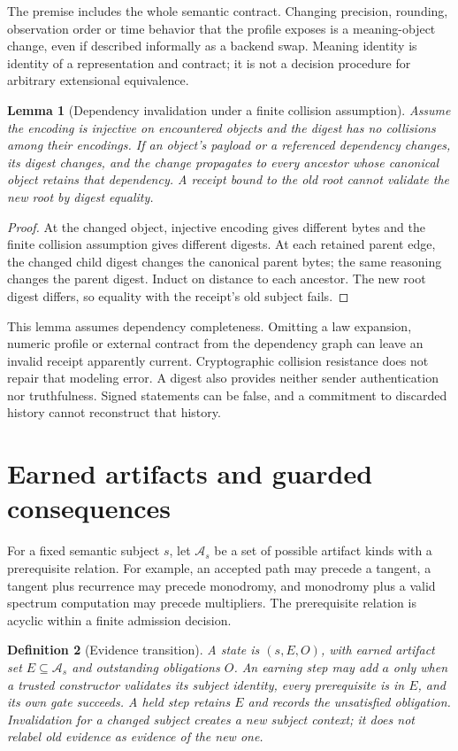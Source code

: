 \documentclass[11pt]{article}
\newtheorem{definition}{Definition}[section]
\newtheorem{lemma}[definition]{Lemma}
\theoremstyle{remark}
\begin{document}
The premise includes the whole semantic contract. Changing precision,
rounding, observation order or time behavior that the profile exposes is a
meaning-object change, even if described informally as a backend swap.
Meaning identity is identity of a representation and contract; it is not a
decision procedure for arbitrary extensional equivalence.

\begin{lemma}[Dependency invalidation under a finite collision assumption]
Assume the encoding is injective on encountered objects and the digest has
no collisions among their encodings. If an object's payload or a referenced
dependency changes, its digest changes, and the change propagates to every
ancestor whose canonical object retains that dependency. A receipt bound
to the old root cannot validate the new root by digest equality.
\end{lemma}
\begin{proof}
At the changed object, injective encoding gives different bytes and the
finite collision assumption gives different digests. At each retained
parent edge, the changed child digest changes the canonical parent bytes;
the same reasoning changes the parent digest. Induct on distance to each
ancestor. The new root digest differs, so equality with the receipt's old
subject fails.
\end{proof}

This lemma assumes dependency completeness. Omitting a law expansion, numeric
profile or external contract from the dependency graph can leave an invalid
receipt apparently current. Cryptographic collision resistance does not
repair that modeling error. A digest also provides neither sender
authentication nor truthfulness. Signed statements can be false, and a
commitment to discarded history cannot reconstruct that history.

\section{Earned artifacts and guarded consequences}
\label{sec:evidence}

For a fixed semantic subject $s$, let $\mathcal A_s$ be a set of possible
artifact kinds with a prerequisite relation. For example, an accepted path
may precede a tangent, a tangent plus recurrence may precede monodromy, and
monodromy plus a valid spectrum computation may precede multipliers. The
prerequisite relation is acyclic within a finite admission decision.

\begin{definition}[Evidence transition]
A state is $(s,E,O)$, with earned artifact set $E\subseteq\mathcal A_s$
and outstanding obligations $O$. An earning step may add $a$ only when a
trusted constructor validates its subject identity, every prerequisite is
in $E$, and its own gate succeeds. A held step retains $E$ and records the
unsatisfied obligation. Invalidation for a changed subject creates a new
subject context; it does not relabel old evidence as evidence of the new one.
\end{definition}
\end{document}
